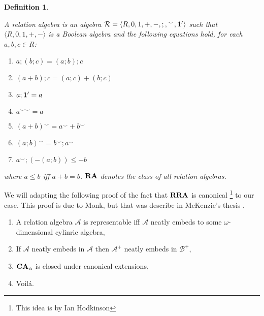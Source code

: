 \documentclass[a4paper]{article}
\theoremstyle{defin}
\newtheorem{defin}{Definition}
\theoremstyle{theorem}
\theoremstyle{prop}
\theoremstyle{lemma}
\theoremstyle{fact}
\theoremstyle{ex}
\theoremstyle{col}
\begin{document}
\begin{defin}
  $ $

    A relation algebra is an algebra $\mathcal{R} = \langle R, 0, 1, +, -, ;, {}^{\smile}, {\bf 1 }' \rangle$ such that $\langle R, 0, 1, +, - \rangle$ is a Boolean algebra and the following
    equations hold, for each $a, b, c \in R$:
    \begin{enumerate}
      \item $a ; (b ; c) = (a ; b) ; c$
      \item $(a + b) ; c = (a ; c) + (b ; c)$
      \item $a ; {\bf 1}' = a$
      \item $a^{\smile \smile} = a$
      \item $(a + b)^{\smile} = a^{\smile} + b^{\smile}$
      \item $(a ; b)^{\smile} = b^{\smile} ; a^{\smile}$
      \item $a^{\smile} ; (- (a ; b)) \leq - b$
    \end{enumerate}
    where $a \leq b$ iff $a + b = b$. ${\bf RA}$ denotes the class of all relation
    algebras.
\end{defin}

We will adapting the following proof of the fact that ${\bf RRA}$ is canonical \footnote{This idea is by Ian Hodkinson} to our case. This proof is due to Monk, but that was describe in McKenzie's thesis \cite{mckenzie1968representation}.

\begin{enumerate}
  \item A relation algebra $\mathcal{A}$ is representable iff $\mathcal{A}$ neatly embeds to some $\omega$-dimensional cylinric algebra,
  \item If $\mathcal{A}$ neatly embeds in $\mathcal{A}$ then $\mathcal{A}^{+}$ neatly embeds in $\mathcal{B}^{+}$,
  \item ${\bf CA}_{\alpha}$ is closed under canonical extensions,
  \item Voil\'{a}.
\end{enumerate}
\end{document}
